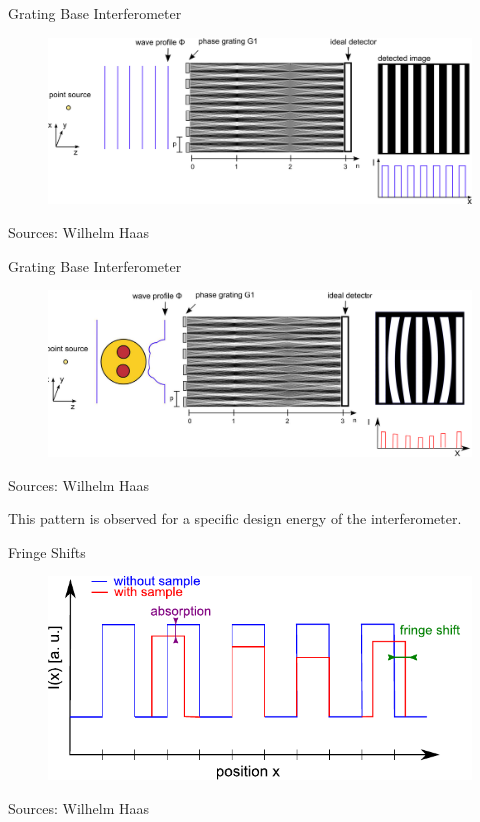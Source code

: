 \begin{frame}[c]{Grating Base Interferometer}
    \begin{figure}
        \includegraphics[width=\linewidth]{images/grabase.eps}
    \end{figure}
    \begin{flushright}
        \scriptsize Sources: Wilhelm Haas
    \end{flushright}
\end{frame}


\begin{frame}{Grating Base Interferometer}
    \begin{figure}
        \includegraphics[width=\textwidth]{images/grasebase2.pdf}
    \end{figure}
    \begin{flushright}
        \scriptsize Sources: Wilhelm Haas
    \end{flushright}
\vspace{-1.5cm}
    This pattern is observed for a specific design energy of the interferometer.
\end{frame}

\begin{frame}{Fringe Shifts}
    \begin{figure}
        \includegraphics[width=0.8\linewidth]{images/frigeshift.pdf}
    \end{figure}
    \begin{flushright}
        \scriptsize Sources: Wilhelm Haas
    \end{flushright}
\end{frame}

